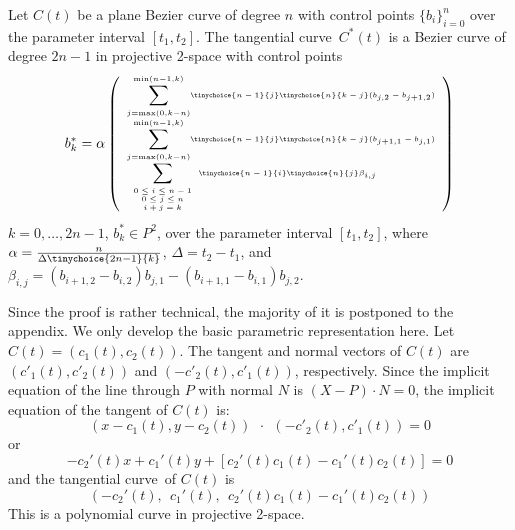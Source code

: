 \documentclass[9pt,twocolumn]{article}
\newcommand{\tang}{tangential curve\ }
\begin{document}
\begin{theorem}
\label{thm:Bezier}
Let $C(t)$ be a plane Bezier curve of degree $n$
with control points $\{ b_i \}_{i=0}^n$ 
over the parameter interval $[t_1,t_2]$.
The \tang $C^*(t)$ is a Bezier curve
of degree $2n-1$ in projective 2-space with control points 
\begin{equation}
\label{eq:dualcoord}
\tiny{
b^*_k = \alpha
\left(
\begin{array}{l}
	\displaystyle{\sum_{j=\mbox{\tiny{max}}(0,k-n)}^{\mbox{\tiny{min}}(n-1,k)}}
	\tinychoice{n-1}{j} \tinychoice{n}{k-j} (b_{j,2} - b_{j+1,2})\\
	\displaystyle{\sum_{j=\mbox{\tiny{max}}(0,k-n)}^{\mbox{\tiny{min}}(n-1,k)}}
	\tinychoice{n-1}{j} \tinychoice{n}{k-j} (b_{j+1,1} - b_{j,1})\\
\displaystyle{\sum_{\begin{array}{c} \mbox{\tiny{$0 \leq i \leq n-1$}} \\ 
		       \mbox{\tiny{$0 \leq j \leq n$}} \\ 
		       \mbox{\tiny{$i+j=k$}}
      \end{array}}}
\tinychoice{n-1}{i} \tinychoice{n}{j} \beta_{i,j}
\end{array}
\right)}
\end{equation}
$k=0,\ldots,2n-1$, $b^*_k \in P^2$, 
over the parameter interval $[t_1,t_2]$, where
$\alpha = \tiny{\frac{n}{\Delta \tinychoice{2n-1}{k}}}$,
$\Delta = t_2 - t_1$, and
$\beta_{i,j} = (b_{i+1,2} - b_{i,2}) b_{j,1} - (b_{i+1,1} - b_{i,1}) b_{j,2}$.
\end{theorem}
\prf
Since the proof is rather technical, the majority of it is postponed to the appendix.
We only develop the basic parametric representation here.
Let $C(t) = (c_1(t), c_2(t))$.
The tangent and normal vectors of $C(t)$ are $(c'_1(t),c'_2(t))$
and $(-c'_2(t), c'_1(t))$, respectively.
Since the implicit equation of the line through $P$ with normal $N$ is 
$(X-P) \cdot N = 0$,
the implicit equation of the tangent of $C(t)$ is:
\[	
	(x-c_1(t), y-c_2(t))\ \  \cdot \ \ (-c'_2(t), c'_1(t)) = 0
\]
or
\[
	-c_2'(t) x + c_1'(t) y + [c_2'(t) c_1(t) - c_1'(t)c_2(t)] = 0 
\]
and the \tang of $C(t)$ is
\begin{equation}
\label{eq:dual1}
  (-c_2'(t),\ \  c_1'(t),\ \ c_2'(t) c_1(t) - c_1'(t)c_2(t))
\end{equation}
%
This is a polynomial curve in projective 2-space.
\QED
\end{document}
